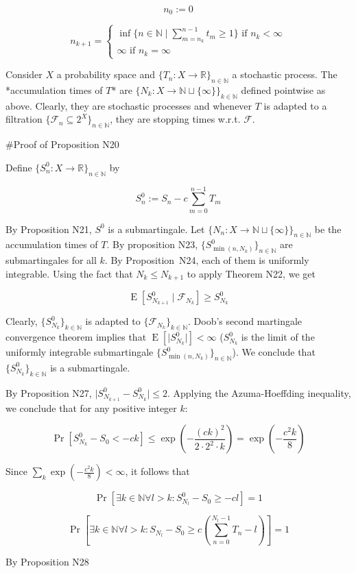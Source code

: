 \documentclass[a4paper]{article}
\DeclareMathOperator{\Prb}{Pr}
\DeclareMathOperator{\E}{E}
\newcommand{\Nats}{\mathbb{N}}
\newcommand{\Reals}{\mathbb{R}}
\newcommand{\Sq}[2]{\{#1\}_{#2 \in \Nats}}
\newcommand{\Sqn}[1]{\Sq{#1}{n}}
\newcommand{\Abs}[1]{\lvert #1 \rvert}
\newcommand{\F}{\mathcal{F}}
\begin{document}
$$n_0 := 0$$

$$n_{k+1} = \begin{cases}\inf \{n \in \Nats \mid \sum_{m=n_k}^{n-1} t_m \geq 1\} \text{ if } n_k < \infty\\\infty \text{ if } n_k = \infty\end{cases}$$

Consider ${X}$ a probability space and ${\{T_n:X \rightarrow \Reals\}_{n \in \Nats}}$ a stochastic process. The *accumulation times of ${T}$* are ${\{N_k: X \rightarrow \Nats \sqcup \{\infty\}\}_{k \in \Nats}}$ defined pointwise as above. Clearly, they are stochastic processes and whenever ${T}$ is adapted to a filtration ${\Sqn{\F_n \subseteq 2^X}}$, they are stopping times w.r.t. ${\F}$.

\#Proof of Proposition N20

Define ${\Sqn{S^0_n: X \rightarrow \Reals}}$ by

$$S^0_n := S_n - c \sum_{m=0}^{n-1} T_m$$

By Proposition N21, ${S^0}$ is a submartingale. Let ${\Sqn{N_n:X \rightarrow \Nats \sqcup \{\infty\}}}$ be the accumulation times of ${T}$. By proposition N23, ${\Sqn{S^0_{\min(n,N_k)}}}$ are submartingales for all ${k}$. By Proposition\ N24, each of them is uniformly integrable. Using the fact that ${N_{k} \leq N_{k+1}}$ to apply Theorem N22, we get

$$\E[S^0_{N_{k+1}} \mid \F_{N_k}] \geq S^0_{N_{k}}$$

Clearly, ${\Sq{S^0_{N_k}}{k}}$ is adapted to ${\Sq{\F_{N_k}}{k}}$. Doob's second martingale convergence theorem implies that ${\E[\Abs{S^0_{N_k}}] < \infty}$ (${S^0_{N_k}}$ is the limit of the uniformly integrable submartingale ${\Sqn{S^0_{\min(n,N_k)}}}$). We conclude that ${\Sq{S^0_{N_k}}{k}}$ is a submartingale.

By Proposition N27, ${\Abs{S^0_{N_{k+1}}-S^0_{N_k}}} \leq 2$. Applying the Azuma-Hoeffding inequality, we conclude that for any positive integer ${k}$:

$$\Prb[S^0_{N_k} - S_0 < -c k] \leq \exp(-\frac{(ck)^2}{2 \cdot 2^2 \cdot k})=\exp(-\frac{c^2 k}{8})$$

Since ${\sum_k \exp(-\frac{c^2 k}{8}) < \infty}$, it follows that

$$\Prb[\exists k \in \Nats \forall l > k: S^0_{N_l} - S_0 \geq -c l]=1$$

$$\Prb[\exists k \in \Nats \forall l > k: S_{N_l} - S_0 \geq c (\sum_{n=0}^{N_l-1} T_n -  l)]=1$$

By Proposition N28
\end{document}
